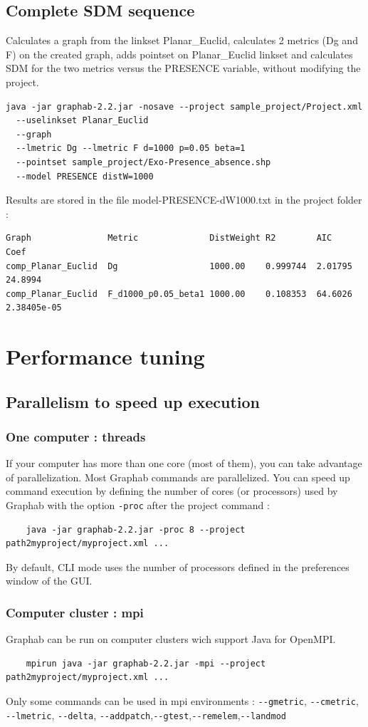 \documentclass[a4paper,10pt]{report}
\begin{document}
\section{Complete SDM sequence}
Calculates a graph from the linkset Planar\_Euclid, calculates 2 metrics (Dg and F) on the created graph, adds pointset on Planar\_Euclid linkset 
and calculates SDM for the two metrics versus the PRESENCE variable, without modifying the project.
\begin{Verbatim}
java -jar graphab-2.2.jar -nosave --project sample_project/Project.xml  
  --uselinkset Planar_Euclid 
  --graph 
  --lmetric Dg --lmetric F d=1000 p=0.05 beta=1 
  --pointset sample_project/Exo-Presence_absence.shp 
  --model PRESENCE distW=1000
\end{Verbatim}
Results are stored in the file model-PRESENCE-dW1000.txt in the project folder :
\begin{Verbatim}
Graph               Metric              DistWeight R2        AIC      Coef
comp_Planar_Euclid  Dg                  1000.00    0.999744  2.01795  24.8994
comp_Planar_Euclid  F_d1000_p0.05_beta1 1000.00    0.108353  64.6026  2.38405e-05
\end{Verbatim}

\chapter{Performance tuning}
\section{Parallelism to speed up execution}
\subsection{One computer : threads}
If your computer has more than one core (most of them), you can take advantage of parallelization. 
Most Graphab commands are parallelized. You can speed up command execution by defining the number
of cores (or processors) used by Graphab with the option \verb|-proc| after the project command :
\begin{Verbatim}
	java -jar graphab-2.2.jar -proc 8 --project path2myproject/myproject.xml ...
\end{Verbatim}
By default, CLI mode uses the number of processors defined in the preferences window of the GUI.
\subsection{Computer cluster : mpi}
Graphab can be run on computer clusters wich support Java for OpenMPI.
\begin{Verbatim}
	mpirun java -jar graphab-2.2.jar -mpi --project path2myproject/myproject.xml ...
\end{Verbatim}
Only some commands can be used in mpi environments : \verb|--gmetric|, \verb|--cmetric|, \verb|--lmetric|, \verb|--delta|, \verb|--addpatch|,\verb|--gtest|,\verb|--remelem|,\verb|--landmod|
\end{document}
